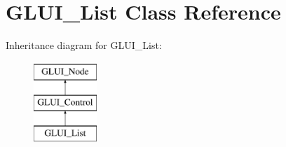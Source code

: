 \hypertarget{classGLUI__List}{\section{G\-L\-U\-I\-\_\-\-List Class Reference}
\label{classGLUI__List}
}
Inheritance diagram for G\-L\-U\-I\-\_\-\-List\-:\begin{figure}[H]
\begin{center}
\leavevmode
\includegraphics[height=3.000000cm]{classGLUI__List}
\end{center}
\end{figure}
